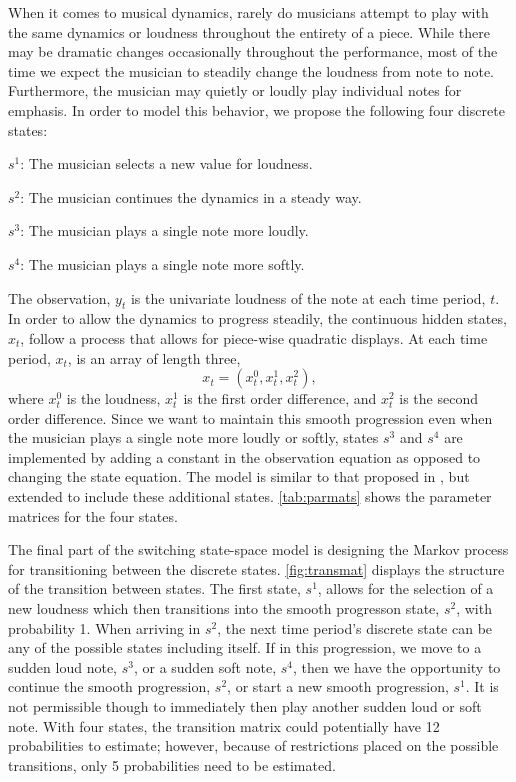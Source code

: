 \documentclass[12pt]{article}
\begin{document}
When it comes to musical dynamics, rarely do musicians attempt to play
with the same dynamics or loudness throughout the entirety of a piece.
While there may be dramatic changes occasionally throughout the
performance, most of the time we expect the musician to steadily change
the loudness from note to note. Furthermore, the musician may quietly or
loudly play individual notes for emphasis. In order to model this
behavior, we propose the following four discrete states:

\begin{list}{}{}

\item[$s^1$:] The musician selects a new value for loudness.

\item[$s^2$:] The musician continues the dynamics in a steady way.

\item[$s^3$:] The musician plays a single note more loudly.

\item[$s^4$:] The musician plays a single note more softly.

\end{list}

The observation, \(y_t\) is the univariate loudness of the note at each
time period, \(t\). In order to allow the dynamics to progress steadily,
the continuous hidden states, \(x_t\), follow a process that allows for
piece-wise quadratic displays. At each time period, \(x_t\), is an array
of length three, \[x_t = (x^0_t, x^1_t, x^2_t), \] where \(x^0_t\) is
the loudness, \(x^1_t\) is the first order difference, and \(x^2_t\) is
the second order difference. Since we want to maintain this smooth
progression even when the musician plays a single note more loudly or
softly, states \(s^3\) and \(s^4\) are implemented by adding a constant
in the observation equation as opposed to changing the state equation.
The model is similar to that proposed in \citet{gu_modeling_2012}, but
extended to include these additional states. \autoref{tab:parmats} shows
the parameter matrices for the four states.

The final part of the switching state-space model is designing the
Markov process for transitioning between the discrete states.
\autoref{fig:transmat} displays the structure of the transition between
states. The first state, \(s^1\), allows for the selection of a new
loudness which then transitions into the smooth progresson state,
\(s^2\), with probability 1. When arriving in \(s^2\), the next time
period's discrete state can be any of the possible states including
itself. If in this progression, we move to a sudden loud note, \(s^3\),
or a sudden soft note, \(s^4\), then we have the opportunity to continue
the smooth progression, \(s^2\), or start a new smooth progression,
\(s^1\). It is not permissible though to immediately then play another
sudden loud or soft note. With four states, the transition matrix could
potentially have 12 probabilities to estimate; however, because of
restrictions placed on the possible transitions, only 5 probabilities
need to be estimated.
\end{document}
